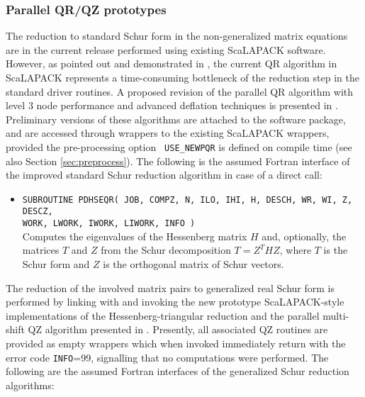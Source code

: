 \documentclass[11pt]{article}
\begin{document}
\subsubsection{Parallel QR/QZ prototypes} \label{sec:reductionproto}
The reduction to standard Schur form in the non-generalized matrix
equations are in the current release performed using existing
ScaLAPACK software. However, as pointed out and demonstrated in
\cite{granatkagstrom09a}, the current QR algorithm in ScaLAPACK
represents a time-consuming bottleneck of the reduction step in
the standard driver routines. A proposed revision of the parallel
QR algorithm with level 3 node performance and advanced deflation
techniques is presented in \cite{granatkagstromkressner09}.
Preliminary versions of these algorithms are attached to the
software package, and are accessed through wrappers to the existing
ScaLAPACK wrappers, provided the pre-processing option {\tt
USE\_NEWPQR} is defined on compile time (see also Section
\ref{sec:preprocess}). The following is the assumed Fortran
interface of the improved standard Schur reduction algorithm in
case of a direct call:

\begin{itemize}
\item \texttt{SUBROUTINE PDHSEQR( JOB, COMPZ, N, ILO, IHI, H,
DESCH, WR, WI, Z, DESCZ, \\ WORK, LWORK, IWORK, LIWORK, INFO )} \\
Computes the eigenvalues of the Hessenberg matrix $H$ and,
optionally, the matrices $T$ and $Z$ from the Schur decomposition
$T = Z^T H Z$, where $T$ is the Schur form and $Z$ is the
orthogonal matrix of Schur vectors.
\end{itemize}

The reduction of the involved matrix pairs to generalized real
Schur form is performed by linking with and invoking the new
prototype ScaLAPACK-style implementations of the
Hessenberg-triangular reduction and the parallel multi-shift QZ
algorithm presented in
\cite{adlerborndacklandkagstrom02,adlerbornkagstromkressner06}.
Presently, all associated QZ routines are provided as empty
wrappers which when invoked immediately return with the error code
{\tt INFO}=99, signalling that no computations were performed. The
following are the assumed Fortran interfaces of the generalized
Schur reduction algorithms:
\end{document}
